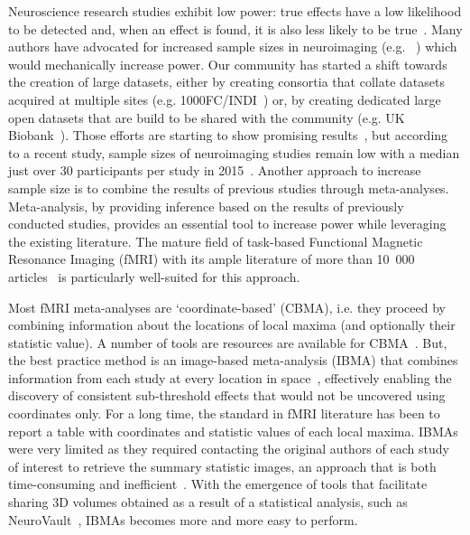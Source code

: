 \documentclass[preprint]{elsarticle}
\begin{document}



Neuroscience research studies exhibit low power: true effects have a low likelihood to be detected and, when an effect is found, it is also less likely to be true~\cite{Button2013}. Many authors have advocated for increased sample sizes in neuroimaging (e.g. ~\cite{Poldrack2014}) which would mechanically increase power. Our community has started a shift towards the creation of large datasets, either by creating consortia that collate datasets acquired at multiple sites (e.g. 1000FC/INDI~\cite{Mennes2013}) or, by creating dedicated large open datasets that are build to be shared with the community (e.g. UK Biobank~\cite{miller2016}). Those efforts are starting to show promising results~\cite{elliott2018}, but according to a recent study, sample sizes of neuroimaging studies remain low with a median just over 30 participants per study in 2015~\cite{Poldrack2014}. Another approach to increase sample size is to combine the results of previous studies through meta-analyses. Meta-analysis, by providing inference based on the results of previously conducted studies, provides an essential tool to increase power while leveraging the existing literature. The mature field of task-based Functional Magnetic Resonance Imaging (fMRI) with its ample literature of more than 10~000 articles~\cite{poline2012} is particularly well-suited for this approach.

Most fMRI meta-analyses are `coordinate-based' (CBMA), i.e. they proceed by combining information about the locations of local maxima (and optionally their statistic value). A number of tools are resources are available for CBMA~\cite{fox2002,Yarkoni2011}. But, the best practice method is an image-based meta-analysis (IBMA) that combines information from each study at every location in space~\cite{Salimi-khorshidi2009}, effectively enabling the discovery of consistent sub-threshold effects that would not be uncovered using coordinates only.
For a long time, the standard in fMRI literature has been to report a table with coordinates and statistic values of each local maxima. IBMAs were very limited as they required contacting the original authors of each study of interest to retrieve the summary statistic images, an approach that is both time-consuming and inefficient~\cite{alsheikh2011}. With the emergence of tools that facilitate sharing 3D volumes obtained as a result of a statistical analysis, such as NeuroVault~\cite{Gorgolewski2015}, IBMAs becomes more and more easy to perform.
\end{document}
